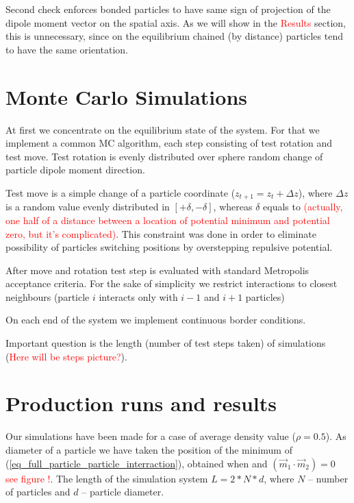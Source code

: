 \documentclass[12pt,a4paper]{article}
\begin{document}
Second check enforces bonded particles to have same sign of projection of the dipole moment vector on the spatial axis. As we will show in the \textcolor{red}{Results} section, this is unnecessary, since on the equilibrium chained (by distance) particles tend to have the same orientation.

\section{Monte Carlo Simulations}

At first we concentrate on the equilibrium state of the system. For that we implement a common MC algorithm, each step consisting of test rotation and test move. Test rotation is evenly distributed over sphere random change of particle dipole moment direction.

Test move is a simple change of a particle coordinate ($z_{t+1} = z_t + \Delta z$), where $\Delta z$ is a random value evenly distributed in $[+\delta, -\delta]$, whereas $\delta$ equals to \textcolor{red}{(actually, one half of a distance between a location of potential minimum and potential zero, but it's complicated)}. This constraint was done in order to eliminate possibility of particles switching positions by overstepping repulsive potential.

After move and rotation test step is evaluated with standard Metropolis acceptance criteria. For the sake of simplicity we restrict interactions to closest neighbours (particle $i$ interacts only with $i-1$ and $i+1$ particles) 

On each end of the system we implement continuous border conditions.

Important question is the length (number of test steps taken) of simulations (\textcolor{red}{Here will be steps picture?}).

\section{Production runs and results}

Our simulations have been made for a case of average density value ($\rho = 0.5$). As diameter of a particle we have taken the position of the minimum of (\ref{eq_full_particle_particle_interraction}), obtained when and $(\vec{m}_1 \cdot \vec{m}_2) = 0$ \textcolor{red}{see figure !}. The length of the simulation system $L = 2*N*d$, where $N$ -- number of particles and $d$ -- particle diameter.




\end{document}
